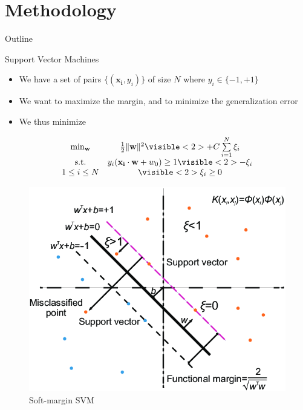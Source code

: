 \documentclass[compress]{beamer}
\DeclarePairedDelimiter{\norm}{\lVert}{\rVert}
\let\vec\mathbf
\begin{document}
\section{Methodology}
\begin{frame}{Outline}
  \tableofcontents[currentsection]
\end{frame}
\begin{frame}{Support Vector Machines}
\begin{multicols}{2}
	{\begin{itemize}
		\item We have a set of pairs $\{(\vec{x_i},y_i)\}$ of size $N$ where $y_i \in \{-1,+1\}$
		\item We want to maximize the margin, and to minimize the generalization error
		\item We thus minimize
	\end{itemize}
	\begin{equation*}
		\begin{matrix}
		\min_\vec{w} & \frac{1}{2}\norm{\vec{w}}^{2} \visible<2>{+ C\sum\limits_{i=1}^{N}\xi_i}\\
		\textup{s.t.} & y_{i}(\vec{x_i} \cdot \vec{w} + w_{0}) \geq 1\visible<2>{-\xi_i}\\
		1 \leq i \leq N & \visible<2>{\xi_i \geq 0} 
		\end{matrix}
	\end{equation*}}
	\begin{figure}
		\includegraphics[width=\linewidth]{data/softmargin.png}
		\caption*{Soft-margin SVM \citep{softmargin}}
	\end{figure}
\end{multicols}
\end{frame}
\end{document}
